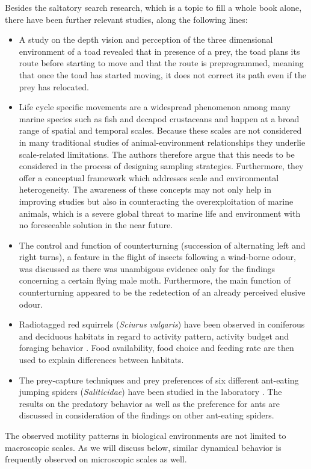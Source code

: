 Besides the saltatory search research, which is a topic to fill a whole book alone, there have been further relevant studies, \eg along the following lines:
\begin{itemize}
 \item A study on the depth vision and perception of the three dimensional environment of a toad \cite{lock:1979} revealed that in presence of a prey, the toad plans its route before starting to move and that the route is preprogrammed, meaning that once the toad has started moving, it does not correct its path even if the prey has relocated.
 \item Life cycle specific movements are a widespread phenomenon among many marine species \cite{pittman:2003} such as fish and decapod crustaceans and happen at a broad range of spatial and temporal scales. Because these scales are not considered in many traditional studies of animal-environment relationships they underlie scale-related limitations. The authors therefore argue that this needs to be considered in the process of designing sampling strategies. Furthermore, they offer a conceptual framework which addresses scale and environmental heterogeneity. The awareness of these concepts may not only help in improving studies but also in counteracting the overexploitation of marine animals, which is a severe global threat to marine life and environment with no foreseeable solution in the near future.
 \item The control and function of counterturning (succession of alternating left and right turns), a feature in the flight of insects following a wind-borne odour, was discussed \cite{kennedy:1983} as there was unambigous evidence only for the findings concerning a certain flying male moth. Furthermore, the main function of counterturning appeared to be the redetection of an already perceived elusive odour.
 \item Radiotagged red squirrels (\textit{Sciurus vulgaris}) have been observed in coniferous and deciduous habitats in regard to activity pattern, activity budget and foraging behavior \cite{wauters:1992}. Food availability, food choice and feeding rate are then used to explain differences between habitats.
 \item The prey-capture techniques and prey preferences of six different ant-eating jumping spiders (\textit{Saliticidae}) have been studied in the laboratory \cite{jackson:1992}. The results on the predatory behavior as well as the preference for ants are discussed in consideration of the findings on other ant-eating spiders.
\end{itemize}
The observed motility patterns in biological environments are not limited to macroscopic scales. As we will discuss below, similar dynamical behavior is frequently observed on microscopic scales as well.

